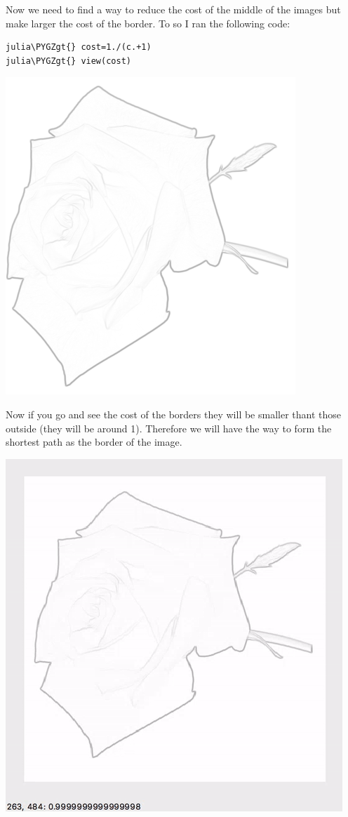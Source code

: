 \documentclass[letterpaper,10pt,english]{sphinxmanual}
\def\PYGZgt{\char`\>}
\begin{document}
Now we need to find a way to reduce the cost of the middle of the images but make larger the cost of the border. To so I ran the following code:

\begin{Verbatim}[commandchars=\\\{\}]
julia\PYGZgt{} cost=1./(c.+1)
julia\PYGZgt{} view(cost)
\end{Verbatim}

\includegraphics{cost.png}

Now if you go and see the cost of the borders they will be smaller thant those outside (they will be around 1). Therefore we will have the way to form the shortest path as the border of the image.

\includegraphics{costvi.gif}
\end{document}
